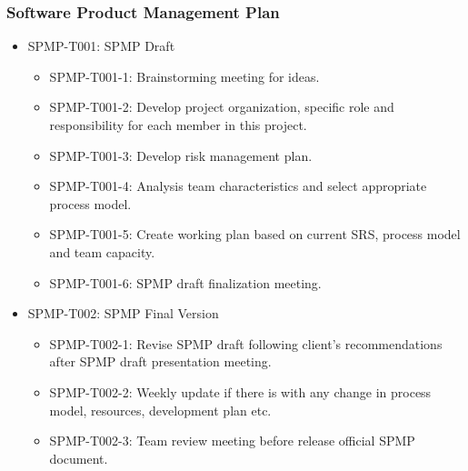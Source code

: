 \documentclass[11pt, a4paper]{article}
\begin{document}
		\subsubsection{Software Product Management Plan}
		\begin{itemize}
			\item SPMP-T001: SPMP Draft
			\begin{itemize}
				\item SPMP-T001-1: Brainstorming meeting for ideas.
				\item SPMP-T001-2: Develop project organization, specific role and responsibility for each member in this project.
				\item SPMP-T001-3: Develop risk management plan.
				\item SPMP-T001-4: Analysis team characteristics and select appropriate process model.  
				\item SPMP-T001-5: Create working plan based on current SRS, process model and team capacity.
				\item SPMP-T001-6: SPMP draft finalization meeting.
			\end{itemize}
			\item SPMP-T002: SPMP Final Version
			\begin{itemize}
				\item  SPMP-T002-1: Revise SPMP draft following client's recommendations after SPMP draft presentation meeting.
				\item  SPMP-T002-2: Weekly update if there is with any change in process model, resources, development plan etc.
				\item  SPMP-T002-3: Team review meeting before release official SPMP document.
			\end{itemize}
		\end{itemize}
	
\end{document}
